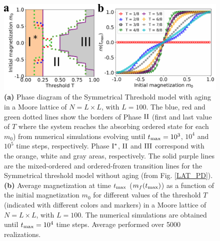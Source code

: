 \begin{figure}
        \centering \captionsetup{font=sf}
        \includegraphics[width=\textwidth]{Figs/Aging_STM/FIG11.pdf}
        \caption[Symmetrical Threshold model with aging in a Moore lattice]{\label{LAT_PDAGING} \textbf{(a)} Phase diagram of the Symmetrical Threshold model with aging in a Moore lattice of $N = L \times L$, with $L = 100$. The blue, red and green dotted lines show the borders of Phase ${\rm II}$ (first and last value of $T$ where the system reaches the absorbing ordered state for each $m_0$) from numerical simulations evolving until $t_{\rm max} = 10^3$, $10^4$ and $10^5$ time steps, respectively. Phase ${\rm I}^{*}$, ${\rm II}$ and ${\rm III}$ correspond with the orange, white and gray areas, respectively. The solid purple lines are the mixed-ordered and ordered-frozen transition lines for the Symmetrical threshold model without aging (from Fig. \ref{LAT_PD}). \textbf{(b)} Average magnetization at time $t_{\rm max}$ ($m_f(t_{\rm max})$) as a function of the initial magnetization $m_0$ for different values of the threshold $T$ (indicated with different colors and markers) in a Moore lattice of $N = L \times L$, with $L = 100$. The numerical simulations are obtained until $t_{\rm max} = 10^4$ time steps. Average performed over 5000 realizations.}
\end{figure}

